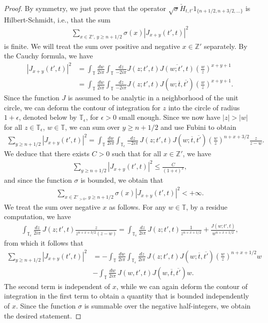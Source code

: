 \documentclass[12pt]{amsart}
\theoremstyle{definition}
\newcommand{\Z}{\mathbb{Z}}
\newcommand{\T}{\mathbb{T}}
\begin{document}
\begin{proof}
By symmetry, we just prove that the operator $\sqrt{\sigma}\check{H}_{t,t'} \mathfrak{1}_{\{n+1/2, n + 3/2, \dots\}}$ is Hilbert-Schmidt, i.e., that the sum
\begin{align*}
    \sum_{x \in \Z', \, y\geq n+1/2} \sigma(x) |J_{x+y}(t',t)|^2
\end{align*}
is finite. We will treat the sum over positive and negative $x \in \Z'$ separately. By the Cauchy formula, we have
\begin{align*}
    |J_{x+y}(t',t)|^2 &=  \int_\T \frac{dw}{2i \pi}\int_\T \frac{dz}{-2i \pi} J(z;t',t)\overline{J(w;t',t)} \left(\frac{w}{z}\right)^{x+y+1} \\
    &=\int_\T \frac{dw}{2i \pi}\int_\T \frac{dz}{-2i \pi} J(z;t',t)J(w;\overline{t},\overline{t'}) \left(\frac{w}{z}\right)^{x+y+1}.
\end{align*}
Since the function $J$ is assumed to be analytic in a neighborhood of the unit circle, we can deform the contour of integration for $z$ into the circle of radius $1+\epsilon$, denoted below by $\T_\epsilon$, for $\epsilon>0$ small enough. Since we now have $|z| > |w|$ for all $z \in \T_\epsilon$, $w \in \T$, we can sum over $y \geq n+1/2$ and use Fubini to obtain
\begin{align*}
    \sum_{ y \geq n+1/2} |J_{x+y}(t',t)|^2 =  \int_\T \frac{dw}{2 i\pi}  \int_{\T_\epsilon}\frac{dz}{-2i \pi}  \, J(z;t',t) J(w;\overline{t},\overline{t'})\left(\frac{w}{z}\right)^{n+x+3/2} \frac{z}{z-w}.
\end{align*}
We deduce that there exists $C>0$ such that for all $x \in \Z'$, we have
\begin{align*}
    \sum_{ y \geq n+1/2} |J_{x+y}(t',t)|^2  \leq \frac{C}{(1 + \epsilon)^x},
\end{align*}
and since the function $\sigma$ is bounded, we obtain that
\begin{align*}
     \sum_{x \in \Z'_{>0}, \, y\geq n+1/2} \sigma(x) |J_{x+y}(t',t)|^2 < +\infty.
\end{align*}
We treat the sum over negative $x$ as follows. For any $w \in \T$, by a residue computation, we have
\begin{align*}
     \int_{\T_\epsilon} \frac{dz}{2i \pi} \, J(z;t',t) \frac{z}{z^{n+x+3/2}(z-w)} = \int_{\T_\epsilon} \frac{dz}{2 i \pi} \,  J(z;t',t) \frac{1}{z^{n+x+1/2}} +  \frac{J(w;t',t)}{w^{n+x+1/2}},
\end{align*}
from which it follows that
\begin{align*}
    \sum_{ y \geq n+1/2} |J_{x+y}(t',t)|^2 &=  -\int_\T \frac{dw}{2 i \pi} \int_{\T_\epsilon} \frac{dz} {2 i \pi} \,J(z;t',t) J(w;\overline{t},\overline{t'}) \left(\frac{w}{z}\right)^{n+x+1/2}w \\
    &- \int_\T \frac{dw}{2 i \pi} \, J(w,t',t)J(w, \overline{t}, \overline{t'})w.
\end{align*}
The second term is independent of $x$, while we can again deform the contour of integration in the first term to obtain a quantity that is bounded independently of $x$. Since the function $\sigma$ is summable over the negative half-integers, we obtain the desired statement.
\end{proof}
\end{document}
